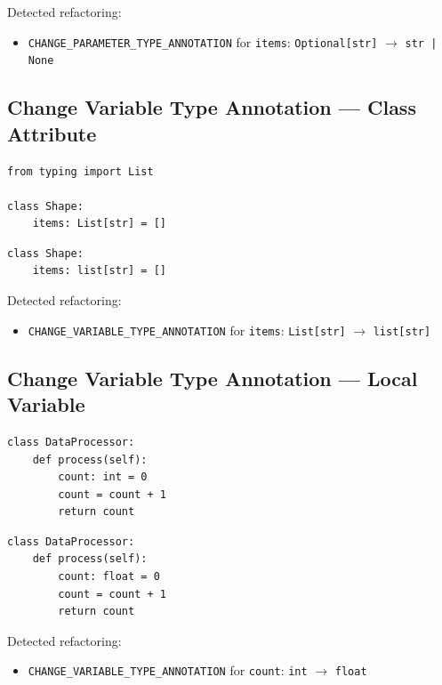 \documentclass[11pt,a4paper]{article}
\newcommand{\code}[1]{\texttt{#1}}
\begin{document}
Detected refactoring:
\begin{itemize}[leftmargin=*]
  \item \code{CHANGE\_PARAMETER\_TYPE\_ANNOTATION} for \code{items}: \code{Optional[str]} $\to$ \code{str | None}
\end{itemize}

\subsection{Change Variable Type Annotation --- Class Attribute}

\begin{lstlisting}[caption={Before: class attribute with \texttt{typing.List}.}]
from typing import List

class Shape:
    items: List[str] = []
\end{lstlisting}

\begin{lstlisting}[caption={After: built-in \texttt{list} (PEP 585).}]
class Shape:
    items: list[str] = []
\end{lstlisting}

Detected refactoring:
\begin{itemize}[leftmargin=*]
  \item \code{CHANGE\_VARIABLE\_TYPE\_ANNOTATION} for \code{items}: \code{List[str]} $\to$ \code{list[str]}
\end{itemize}

\subsection{Change Variable Type Annotation --- Local Variable}

\begin{lstlisting}[caption={Before: local variable annotated as \texttt{int}.}]
class DataProcessor:
    def process(self):
        count: int = 0
        count = count + 1
        return count
\end{lstlisting}

\begin{lstlisting}[caption={After: annotation changed to \texttt{float}.}]
class DataProcessor:
    def process(self):
        count: float = 0
        count = count + 1
        return count
\end{lstlisting}

Detected refactoring:
\begin{itemize}[leftmargin=*]
  \item \code{CHANGE\_VARIABLE\_TYPE\_ANNOTATION} for \code{count}: \code{int} $\to$ \code{float}
\end{itemize}
\end{document}
